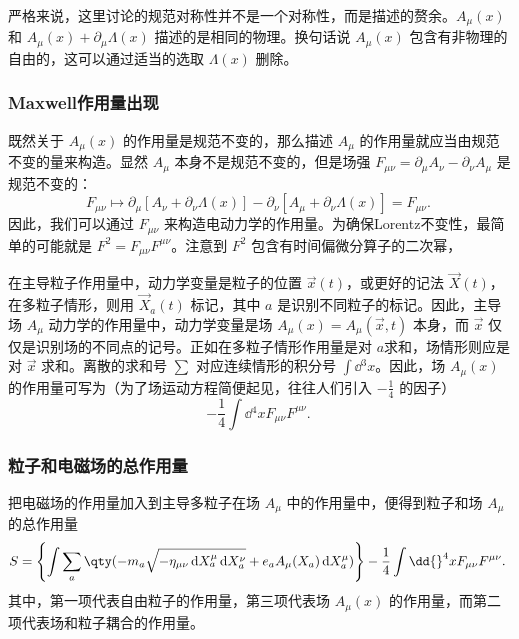 严格来说，这里讨论的规范对称性并不是一个对称性，而是描述的赘余。$A_\mu(x)$ 和 $A_\mu(x)+\partial_\mu\Lambda(x)$ 描述的是相同的物理。换句话说 $A_\mu(x)$ 包含有非物理的自由的，这可以通过适当的选取 $\Lambda(x)$ 删除。

\subsubsection{Maxwell作用量出现}

既然关于 $A_\mu(x)$ 的作用量是规范不变的，那么描述 $A_\mu$ 的作用量就应当由规范不变的量来构造。显然 $A_\mu$ 本身不是规范不变的，但是场强 $F_{\mu\nu}=\partial_\mu A_\nu-\partial_\nu A_\mu$ 是规范不变的：
\begin{equation}
F_{\mu\nu}\mapsto \partial_\mu[ A_\nu+\partial_\nu\Lambda(x)]-\partial_\nu[ A_\mu+\partial_\nu\Lambda(x)]=F_{\mu\nu}.~
\end{equation}
因此，我们可以通过 $F_{\mu\nu}$ 来构造电动力学的作用量。为确保Lorentz不变性，最简单的可能就是 $F^2=F_{\mu\nu}F^{\mu\nu}$。注意到 $F^2$ 包含有时间偏微分算子的二次幂，

在主导粒子作用量中，动力学变量是粒子的位置 $\vec x(t)$，或更好的记法 $\vec X(t)$，在多粒子情形，则用 $\vec X_a(t)$ 标记，其中 $a$ 是识别不同粒子的标记。因此，主导场 $A_\mu$ 动力学的作用量中，动力学变量是场 $A_\mu(x)=A_\mu(\vec x,t)$ 本身，而 $\vec x$ 仅仅是识别场的不同点的记号。正如在多粒子情形作用量是对 $a$求和，场情形则应是对 $\vec x$ 求和。离散的求和号 $\sum$ 对应连续情形的积分号 $\int\dd{}^3 x$。因此，场 $A_\mu(x)$ 的作用量可写为（为了场运动方程简便起见，往往人们引入 $-\frac{1}{4}$ 的因子）
\begin{equation}
-\frac{1}{4}\int\dd{}^4 x F_{\mu\nu}F^{\mu\nu}.~
\end{equation}

\subsubsection{粒子和电磁场的总作用量}

把电磁场的作用量加入到主导多粒子在场 $A_\mu$ 中的作用量中，便得到粒子和场 $A_\mu$ 的总作用量
\begin{equation}
 S=\left\{\int\sum_a\qty(-m_a\sqrt{-\eta_{\mu\nu} \,\mathrm{d} X_a ^\mu \,\mathrm{d}X_a ^\nu}+e_aA_\mu(X_a) \,\mathrm{d}X_a ^\mu) \right\}-\frac{1}{4}\int\dd{}^4 x F_{\mu\nu}F^{\mu\nu}.~
\end{equation}
其中，第一项代表自由粒子的作用量，第三项代表场 $A_\mu(x)$ 的作用量，而第二项代表场和粒子耦合的作用量。









